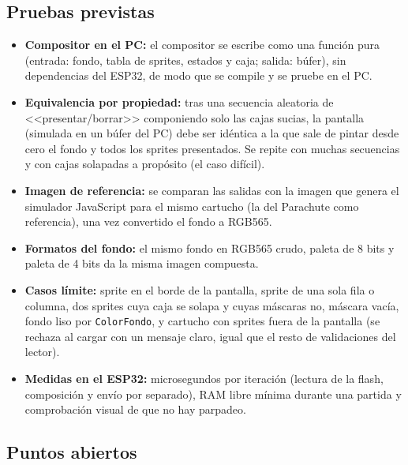 \subsection{Pruebas previstas}
\label{sec:F6I91Pruebas}

\begin{itemize}
	\item \textbf{Compositor en el PC:} el compositor se escribe como una función pura (entrada: fondo, tabla de sprites, estados y caja; salida: búfer), sin dependencias del ESP32, de modo que se compile y se pruebe en el PC.
	\item \textbf{Equivalencia por propiedad:} tras una secuencia aleatoria de <<presentar/borrar>> componiendo solo las cajas sucias, la pantalla (simulada en un búfer del PC) debe ser idéntica a la que sale de pintar desde cero el fondo y todos los sprites presentados. Se repite con muchas secuencias y con cajas solapadas a propósito (el caso difícil).
	\item \textbf{Imagen de referencia:} se comparan las salidas con la imagen que genera el simulador JavaScript para el mismo cartucho (la del Parachute como referencia), una vez convertido el fondo a RGB565.
	\item \textbf{Formatos del fondo:} el mismo fondo en RGB565 crudo, paleta de 8 bits y paleta de 4 bits da la misma imagen compuesta.
	\item \textbf{Casos límite:} sprite en el borde de la pantalla, sprite de una sola fila o columna, dos sprites cuya caja se solapa y cuyas máscaras no, máscara vacía, fondo liso por \texttt{ColorFondo}, y cartucho con sprites fuera de la pantalla (se rechaza al cargar con un mensaje claro, igual que el resto de validaciones del lector).
	\item \textbf{Medidas en el ESP32:} microsegundos por iteración (lectura de la flash, composición y envío por separado), RAM libre mínima durante una partida y comprobación visual de que no hay parpadeo.
\end{itemize}

\subsection{Puntos abiertos}
\label{sec:F6I91Abiertos}


